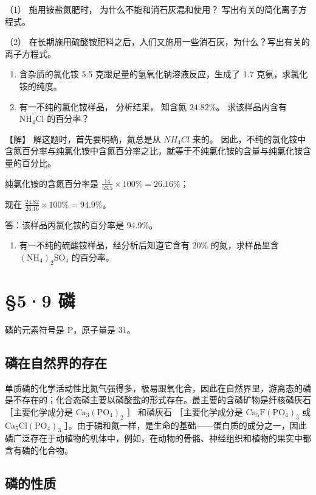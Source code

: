 （1） 施用铵盐氮肥时， 为什么不能和消石灰混和使用？
写出有关的简化离子方程式。

（2）
在长期施用硫酸铵肥料之后，人们又施用一些消石灰，为什么？写出有关的离子方程式。

\begin{enumerate}[start=6]
\item
  含杂质的氯化铵 5.5 克跟足量的氢氧化钠溶液反应，生成了 1.7
  克氨，求氯化铵的纯度。
\item
  有一不纯的氯化铵样品， 分析结果， 知含氮 \(24.82\%\)。 求该样品内含有
  \(\mathrm{NH}_{4} \mathrm{Cl}\) 的百分率？
\end{enumerate}

【解】 解这题时，首先要明确，氮总是从 \(NH_{4}Cl\) 来的。
因此，不纯的氯化铵中含氮百分率与纯氯化铵中含氮百分率之比，就等于不纯氯化铵的含量与纯氯化铵含量的百分比。

纯氯化铵的含氮百分率是 \(\frac{14}{53.5} \times 100\% = 26.16\%\)；

现在 \(\frac{24.82}{26.16} \times 100\% = 94.9\%\)。

答：该样品丙氯化铵的百分率是 94.9\%。

\begin{enumerate}[start=8]
\item
  有一不纯的硫酸铵样品，经分析后知道它含有 \(20\%\) 的氮，求样品里含
  \((\mathrm{NH}_4)_2\mathrm{SO}_4\) 的百分率。
\end{enumerate}

\section{§5·9 磷}

磷的元素符号是 P，原子量是 31。

\subsection{磷在自然界的存在}

单质磷的化学活动性比氮气强得多，极易跟氧化合，因此在自然界里，游离态的磷是不存在的；化合态磷主要以磷酸盐的形式存在。最主要的含磷矿物是纤核磷灰石
［主要化学成分是 \(\mathrm{Ca}_{3}(\mathrm{PO}_{4})_{2}\) ］ 和磷灰石
［主要化学成分是 \(\mathrm{Ca}_{5}\mathrm{F}(\mathrm{PO}_{4})_{3}\) 或
\(\mathrm{Ca}_{5}\mathrm{Cl}(\mathrm{PO}_{4})_{3}\)
］。由于磷和氮一样，是生命的基础------蛋白质的成分之一，因此磷广泛存在于动植物的机体中，例如，在动物的骨骼、神经组织和植物的果实中都含有磷的化合物。

\subsection{磷的性质}

